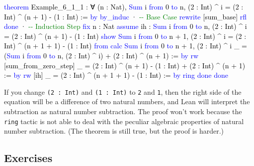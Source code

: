 \documentclass[
  letterpaper,
  DIV=11,
  numbers=noendperiod]{scrreprt}
\newenvironment{Shaded}{\begin{snugshade}}{\end{snugshade}}
\newcommand{\CommentTok}[1]{\textcolor[rgb]{0.37,0.37,0.37}{#1}}
\newcommand{\KeywordTok}[1]{\textcolor[rgb]{0.00,0.23,0.31}{#1}}
\newcommand{\NormalTok}[1]{\textcolor[rgb]{0.00,0.23,0.31}{#1}}
\renewcommand{\NormalTok}[1]{\textcolor[HTML]{000000}{#1}}
\renewcommand{\KeywordTok}[1]{\textcolor[HTML]{0000FF}{#1}}
\renewcommand{\CommentTok}[1]{\textcolor[HTML]{008000}{#1}}
\theoremstyle{remark}
\begin{document}
\begin{Shaded}
\begin{Highlighting}[]
\KeywordTok{theorem}\NormalTok{ Example\_6\_1\_1 :}
\NormalTok{    ∀ (n : Nat), }\KeywordTok{Sum}\NormalTok{ i }\KeywordTok{from}\NormalTok{ 0 }\KeywordTok{to}\NormalTok{ n, (2 : Int) \^{} i =}
\NormalTok{    (2 : Int) \^{} (n + 1) {-} (1 : Int) := }\KeywordTok{by}
  \KeywordTok{by\_induc}
\NormalTok{  · }\CommentTok{{-}{-} Base Case}
    \KeywordTok{rewrite}\NormalTok{ [sum\_base]}
    \KeywordTok{rfl}
    \KeywordTok{done}
\NormalTok{  · }\CommentTok{{-}{-} Induction Step}
    \KeywordTok{fix}\NormalTok{ n : Nat}
    \KeywordTok{assume}\NormalTok{ ih : }\KeywordTok{Sum}\NormalTok{ i }\KeywordTok{from}\NormalTok{ 0 }\KeywordTok{to}\NormalTok{ n, (2 : Int) \^{} i =}
\NormalTok{        (2 : Int) \^{} (n + 1) {-} (1 : Int)}
    \KeywordTok{show} \KeywordTok{Sum}\NormalTok{ i }\KeywordTok{from}\NormalTok{ 0 }\KeywordTok{to}\NormalTok{ n + 1, (2 : Int) \^{} i =}
\NormalTok{        (2 : Int) \^{} (n + 1 + 1) {-} (1 : Int) }\KeywordTok{from}
      \KeywordTok{calc} \KeywordTok{Sum}\NormalTok{ i }\KeywordTok{from}\NormalTok{ 0 }\KeywordTok{to}\NormalTok{ n + 1, (2 : Int) \^{} i}
\NormalTok{        \_ = (}\KeywordTok{Sum}\NormalTok{ i }\KeywordTok{from}\NormalTok{ 0 }\KeywordTok{to}\NormalTok{ n, (2 : Int) \^{} i)}
\NormalTok{            + (2 : Int) \^{} (n + 1) := }\KeywordTok{by} \KeywordTok{rw}\NormalTok{ [sum\_from\_zero\_step]}
\NormalTok{        \_ = (2 : Int) \^{} (n + 1) {-} (1 : Int)}
\NormalTok{            + (2 : Int) \^{} (n + 1) := }\KeywordTok{by} \KeywordTok{rw}\NormalTok{ [ih]}
\NormalTok{        \_ = (2 : Int) \^{} (n + 1 + 1) {-} (1 : Int) := }\KeywordTok{by} \KeywordTok{ring}
    \KeywordTok{done}
  \KeywordTok{done}
\end{Highlighting}
\end{Shaded}

If you change \texttt{(2\ :\ Int)} and \texttt{(1\ :\ Int)} to
\texttt{2} and \texttt{1}, then the right side of the equation will be a
difference of two natural numbers, and Lean will interpret the
subtraction as natural number subtraction. The proof won't work because
the \texttt{ring} tactic is not able to deal with the peculiar algebraic
properties of natural number subtraction. (The theorem is still true,
but the proof is harder.)

\hypertarget{exercises-14}{%
\subsection{Exercises}\label{exercises-14}}
\end{document}
